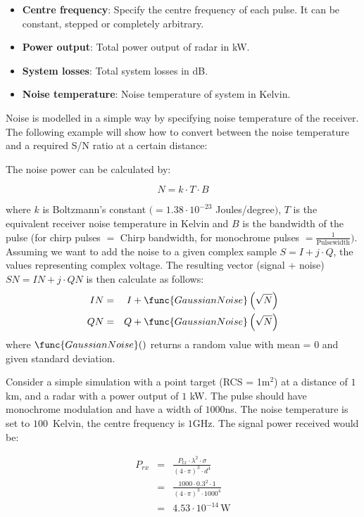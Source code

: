 \begin{itemize}
\item  \textbf{Centre frequency}: Specify the centre frequency of each
pulse. It can be constant, stepped or completely arbitrary.

\item  \textbf{Power output}: Total power output of radar in kW.

\item  \textbf{System losses}: Total system losses in dB.

\item  \textbf{Noise temperature}: Noise temperature of system in Kelvin.
\end{itemize}

Noise is modelled in a simple way by specifying noise temperature of the
receiver. The following example will show how to convert between the noise
temperature and a required S/N ratio at a certain distance:

The noise power can be calculated by:

\begin{equation}
N=k\cdot T\cdot B
\end{equation}

where $k$ is Boltzmann's constant $(=1.38\cdot 10^{-23}$ Joules/degree$)$, $%
T $ is the equivalent receiver noise temperature in Kelvin and $B$ is the
bandwidth of the pulse (for chirp pulses $=$ Chirp bandwidth, for monochrome
pulses $=\frac{1}{\text{Pulsewidth}})$. Assuming we want to add the noise to
a given complex sample $S=I+j\cdot Q$, the values representing complex
voltage. The resulting vector (signal + noise) $SN=IN+j\cdot QN$ is then
calculate as follows: 
\begin{eqnarray}
IN &=&I+\func{GaussianNoise}\left( \sqrt{N}\right) \\
QN &=&Q+\func{GaussianNoise}\left( \sqrt{N}\right)
\end{eqnarray}
where $\func{GaussianNoise}()$ returns a random value with mean = 0 and
given standard deviation.

Consider a simple simulation with a point target (RCS = 1\thinspace m$^{2}$)
at a distance of $1$\thinspace km, and a radar with a power output of $1$%
\thinspace kW. The pulse should have monochrome modulation and have a width
of $1000$\thinspace ns. The noise temperature is set to $100$~Kelvin, the
centre frequency is $1$\thinspace GHz. The signal power received would be:

\begin{eqnarray}
P_{rx} &=&\frac{P_{tx}\cdot \lambda ^{2}\cdot \sigma }{(4\cdot \pi
)^{3}\cdot d^{4}} \\
&=&\frac{1000\cdot 0.3^{2}\cdot 1}{(4\cdot \pi )^{3}\cdot 1000^{4}} \\
&=&4.53\cdot 10^{-14}\,\text{W}
\end{eqnarray}


